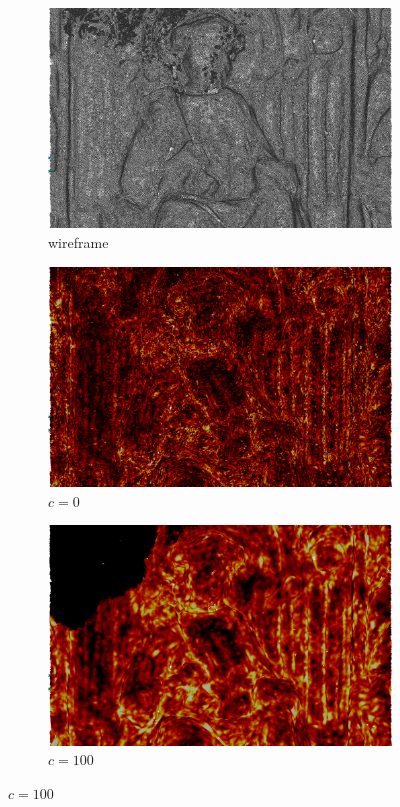 \begin{figure}[ht]
	\begin{subfigure}[b]{0.32\linewidth}
		\includegraphics[width=\linewidth]{data/acquired_meshes/unisiegel_wireframe.png}
		\caption{wireframe}\label{fig:unisiegel.a}
	\end{subfigure}
	\begin{subfigure}[b]{0.32\linewidth}
		\includegraphics[width=\linewidth]{data/acquired_meshes/unisiegel_0iter.png}
		\caption{$c=0$}\label{fig:unisiegel.b}
	\end{subfigure}
	\begin{subfigure}[b]{0.32\linewidth}
		\includegraphics[width=\linewidth]{data/acquired_meshes/unisiegel_100iter.png}
		\caption{$c=100$}\label{fig:unisiegel.c}
	\end{subfigure}
\end{figure}
